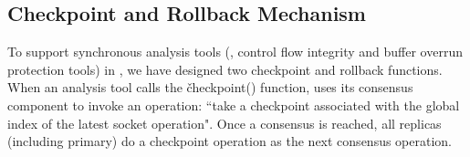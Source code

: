 

% 
% 



\subsection{Checkpoint and Rollback Mechanism} \label{sec:checkpoint}

To support synchronous analysis tools (\eg, control flow integrity and buffer 
overrun protection tools) in \xxx, we have designed two checkpoint and rollback 
functions. When an analysis tool calls the \v{checkpoint()} function, \xxx uses 
its \paxos consensus component to invoke an operation: ``take a checkpoint 
associated with the global index of the latest socket operation". Once a 
consensus is reached, all replicas (including primary) do a checkpoint 
operation as the next consensus operation.


